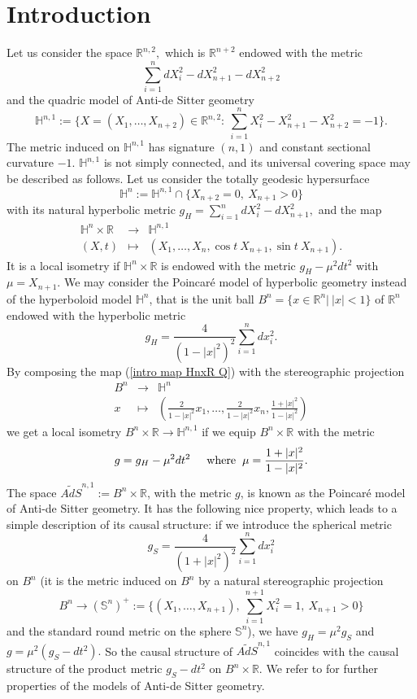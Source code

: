 \documentclass[10pt,reqno,oneside]{amsart}
\theoremstyle{definition}
\theoremstyle{remark}
\newcommand{\R}{\mathbb{R}}
\begin{document}
\section{Introduction}
Let us consider the space $\R^{n,2},$ which is $\R^{n+2}$ endowed with the metric
$$\sum_{i=1}^ndX_{i}^2-dX_{n+1}^2-dX_{n+2}^2$$
and the quadric model of Anti-de Sitter geometry
\begin{equation}\label{quadric model}
\mathbb{H}^{n,1}:=\{X=(X_1,\ldots,X_{n+2})\in\R^{n,2}:\ \sum_{i=1}^nX_i^2-X_{n+1}^2-X_{n+2}^2=-1\}.
\end{equation}
The metric induced on $\mathbb{H}^{n,1}$ has signature $(n,1)$ and constant sectional curvature $-1.$ $\mathbb{H}^{n,1}$ is not simply connected, and its universal covering space may be described as follows. Let us consider the totally geodesic hypersurface
\begin{equation}\label{intro hyperboloid model}
\mathbb{H}^{n}:=\mathbb{H}^{n,1}\cap\{X_{n+2}=0,\ X_{n+1}>0\}
\end{equation}
with its natural hyperbolic metric $g_H=\sum_{i=1}^ndX_{i}^2-dX_{n+1}^2,$ and the map 
\begin{eqnarray}
\mathbb{H}^n\times\R&\rightarrow&\mathbb{H}^{n,1}\label{intro map HnxR Q}\\
(X,t)&\mapsto& (X_1,\ldots,X_n,\cos t\ X_{n+1},\sin t\ X_{n+1}).\nonumber
\end{eqnarray}
It is a local isometry if $\mathbb{H}^n\times\R$ is endowed with the metric $g_H-\mu^2 dt^2$ with $\mu=X_{n+1}.$ We may consider the Poincar\'e model of hyperbolic geometry instead of the hyperboloid model $\mathbb{H}^n$, that is the unit ball $B^n=\{x\in\R^n|\ |x|<1\}$ of $\R^n$ endowed with the hyperbolic metric 
$$g_H=\frac{4}{(1-|x|^2)^2}\sum_{i=1}^ndx_i^2.$$
By composing the map (\ref{intro map HnxR Q}) with the stereographic projection
\begin{eqnarray}
B^n&\rightarrow&\mathbb{H}^n\\
x&\mapsto&\left(\frac{2}{1-|x|^2}x_1,\ldots,\frac{2}{1-|x|^2}x_n,\frac{1+|x|^2}{1-|x|^2}\right)\nonumber
\end{eqnarray}
we get a local isometry $B^n\times\R\rightarrow\mathbb{H}^{n,1}$ if we equip $B^n\times\R$ with the metric
$$g=g_H-\mu^2dt^2\hspace{.5cm}\mbox{where}\hspace{.2cm}\mu=\frac{1+|x|^2}{1-|x|^2}.$$
The space $\widetilde{AdS}^{n,1}:=B^n\times\R$, with the metric $g$, is known as the Poincar\'e model of Anti-de Sitter geometry. It has the following nice property, which leads to a simple description of its causal structure: if we introduce the spherical metric 
$$g_S=\frac{4}{(1+|x|^2)^2}\sum_{i=1}^ndx_i^2$$
on $B^n$ (it is the metric induced on $B^n$ by a natural stereographic projection 
$$B^n\rightarrow (\mathbb{S}^n)^+:=\{(X_1,\ldots,X_{n+1}),\ \sum_{i=1}^{n+1}X_i^2=1,\ X_{n+1}>0\}$$ 
and the standard round metric on the sphere $\mathbb{S}^n$), we have $g_H=\mu^2 g_S$ and $g=\mu^2(g_S-dt^2).$ So the causal structure of $\widetilde{AdS}^{n,1}$ coincides with the causal structure of the product metric $g_S-dt^2$ on $B^n\times\R.$ We refer to \cite{BoSe1} for further properties of the models of Anti-de Sitter geometry.
\\
\end{document}
